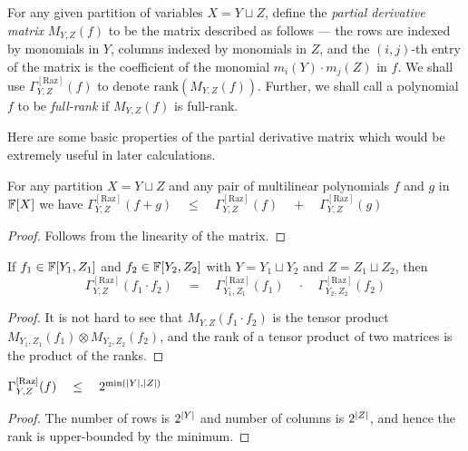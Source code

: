 \documentclass{birkjour}
\newcommand{\CM}[1]{\Gamma^{\mathrm{[#1]}}}
\newcommand{\spaced}[1]{\quad#1\quad}
\begin{document}
\begin{definition}
For any given partition of variables $X = Y \sqcup Z$, define the \emph{partial derivative matrix} $M_{Y,Z}(f)$ to be the matrix described as follows --- the rows are indexed by monomials in $Y$, columns indexed by monomials in $Z$, and the $(i,j)$-th entry of the matrix is the coefficient of the monomial $m_i(Y)\cdot m_j(Z)$ in $f$. We shall use $\Gamma^{\mathrm{[Raz]}}_{Y,Z}(f)$ to denote $\mathrm{rank}(M_{Y,Z}(f))$. Further, we shall call a polynomial $f$ to be \emph{full-rank} if $M_{Y,Z}(f)$ is full-rank.
\end{definition}

Here are some basic properties of the partial derivative matrix which would be extremely useful in later calculations.

\begin{observation}\label{obs:pdm-subadditivity}
	For any partition $X = Y \sqcup Z$ and any pair of multilinear 
	polynomials $f$ and $g$ in $\mathbb{F}[X]$ we have 
$\CM{Raz}_{Y,Z}(f+g) \spaced{\leq} \CM{Raz}_{Y,Z}(f) \spaced{+} \CM{Raz}_{Y,Z}(g)$
\end{observation}
\begin{proof}
Follows from the linearity of the matrix. 
\end{proof}

\begin{observation}[Multiplicativity]\label{obs:pdm-multiplicativity}
If $f_1 \in \mathbb{F}[Y_1,Z_1]$ and $f_2 \in \mathbb{F}[Y_2, Z_2]$ with $Y = Y_1 \sqcup Y_2$ and $Z = Z_1 \sqcup Z_2$, then
$$
\CM{Raz}_{Y,Z}(f_1\cdot f_2) \spaced{=} \CM{Raz}_{Y_1, Z_1}(f_1) \spaced{\cdot} \CM{Raz}_{Y_2, Z_2}(f_2)
$$
\end{observation}
\begin{proof}
  It is not hard to see that $M_{Y,Z}(f_1\cdot f_2)$ is the tensor product $M_{Y_1, Z_1}(f_1) \otimes M_{Y_2, Z_2}(f_2)$, and the rank of a tensor product of two matrices is the product of the ranks.
\end{proof}

\begin{observation}\label{obs:pdm-upperbound}
  $\CM{Raz}_{Y,Z}(f) \spaced{\leq} 2^{\min(\abs{Y}, \abs{Z})}$
\end{observation}
\begin{proof}
  The number of rows is $2^{\left|Y\right|}$ and number of columns is $2^{\left|Z\right|}$, and hence the rank is upper-bounded by the minimum.
\end{proof}
\end{document}
